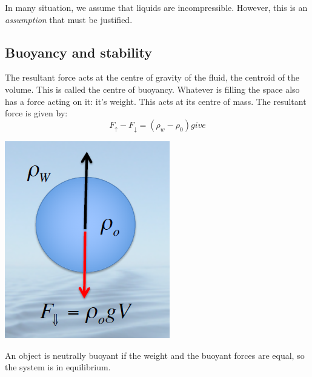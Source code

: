 \documentclass[class=report, crop=false, 12pt,a4paper]{standalone}
\begin{document}
In many situation, we assume  that liquids are incompressible. However, this is an \emph{assumption} that must be justified. 

\subsection{Buoyancy and stability}
The resultant force acts at the centre of gravity of the fluid, the centroid of the volume. This is called the centre of buoyancy. Whatever is filling the space also has a force acting on it: it's weight. This acts at its centre of mass. The resultant force is given by: 
\begin{equation}
  F_\uparrow - F_\downarrow = (\rho_w - \rho_0) give
\end{equation}
\begin{center}
  \includegraphics[width = 0.4 \textwidth]{../img/BuoyancyForces}
\end{center}
An object is neutrally buoyant if the weight and the buoyant forces are equal, so the system is in equilibrium. 
\end{document}
